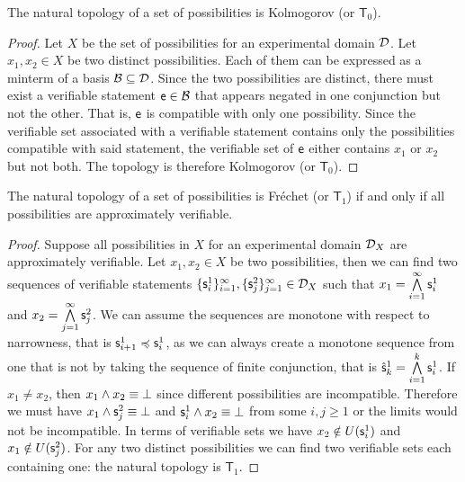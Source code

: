 	\begin{mathSection}
		\begin{prop}
			The natural topology of a set of possibilities is Kolmogorov (or $\mathsf{T}_0$).
		\end{prop}
		\begin{proof}
			Let $X$ be the set of possibilities for an experimental domain $\edomain$. Let $x_1, x_2 \in X$ be two distinct possibilities. Each of them can be expressed as a minterm of a basis $\basis \subseteq \edomain$. Since the two possibilities are distinct, there must exist a verifiable statement $\stmt[e] \in \basis$ that appears negated in one conjunction but not the other. That is, $\stmt[e]$ is compatible with only one possibility. Since the verifiable set associated with a verifiable statement contains only the possibilities compatible with said statement, the verifiable set of $\stmt[e]$ either contains $x_1$ or $x_2$ but not both. The topology is therefore Kolmogorov (or $\mathsf{T}_0$).
		\end{proof}
		\begin{prop}
			The natural topology of a set of possibilities is Fr\'echet (or $\mathsf{T}_1$) if and only if all possibilities are approximately verifiable.
		\end{prop}
		\begin{proof}
			Suppose all possibilities in $X$ for an experimental domain $\edomain_X$ are approximately verifiable. Let $x_1, x_2 \in X$ be two possibilities, then we can find two sequences of verifiable statements $\{\stmt_i^1\}_{i=1}^\infty, \{\stmt_j^2\}_{j=1}^\infty \in \edomain_X$ such that $x_1=\bigAND\limits_{i=1}^\infty \stmt_i^1$ and $x_2=\bigAND\limits_{j=1}^\infty \stmt_j^2$. We can assume the sequences are monotone with respect to narrowness, that is $\stmt_{i+1}^1 \narrower \stmt_i^1$, as we can always create a monotone sequence from one that is not by taking the sequence of finite conjunction, that is $\hat{\stmt}_k^1=\bigAND\limits_{i=1}^k \stmt_i^1$. If $x_1 \neq x_2$, then $x_1 \AND x_2 \equiv \impossibility$ since different possibilities are incompatible. Therefore we must have $x_1 \AND \stmt_j^2 \equiv \impossibility$ and $\stmt_i^1 \AND x_2 \equiv \impossibility$ from some $i,j \geq 1$ or the limits would not be incompatible. In terms of verifiable sets we have $x_2 \notin U(\stmt_i^1)$ and $x_1 \notin U(\stmt_j^2)$. For any two distinct possibilities we can find two verifiable sets each containing one: the natural topology is $\mathsf{T}_1$.
			

\end{proof}
\end{mathSection}
